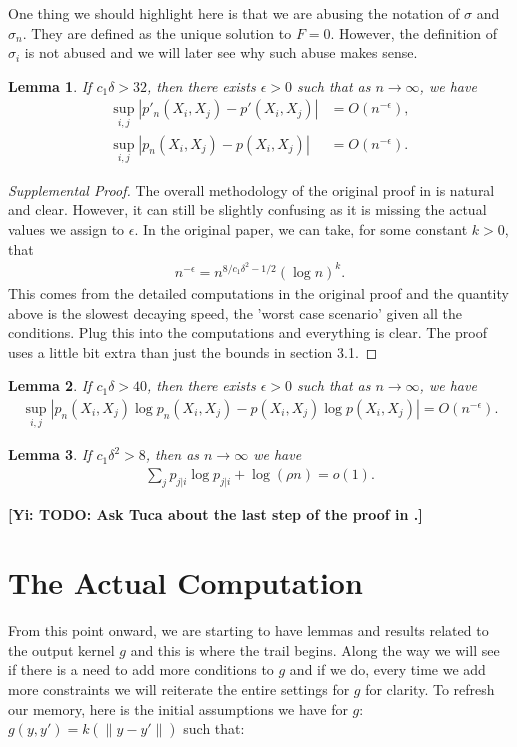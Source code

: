 \documentclass[10pt]{article}
\newcommand{\norm}[1]{\left\lVert#1\right\rVert}
\newcommand{\gy}[1]{\textbf{\color{gred}[Yi: #1]}}
\newtheorem{lemma}{\bf Lemma}
\newenvironment{Proof of lemma}{\noindent{\bf Proof of Lemma}}{\hfill$\Box$\newline}
\newenvironment{Proof of claim}{\noindent{\bf Proof of claim}}{\hfill$\Box$\newline}
\newenvironment{Proof of theorem}{\noindent{\bf Proof of Theorem}}{\hfill\scriptsize{$\Box$}\newline}
\newenvironment{Proof of theorems}{\noindent{\bf Proof of Theorems}}{\hfill$\Box$\newline}
\newenvironment{Proof of proposition}{\noindent{\bf Proof of Proposition}}{\hfill$\Box$\newline}
\newenvironment{Proof of propositions}{\noindent{\bf Proof of Propositions}}{\hfill$\Box$\newline}
\newenvironment{Proof of exercise}{\noindent{\it Proof of Exercise:}}{\hfill$\Box$}
\numberwithin{equation}{section}
\begin{document}
One thing we should highlight here is that we are abusing the notation of $\sigma$ and $\sigma_n$. They are defined as the unique solution to $F=0$. However, the definition of $\sigma_i$ is not abused and we will later see why such abuse makes sense.
\begin{lemma} \label{integrand_lemma_2}
    If $c_1 \delta >32$, then there exists $\epsilon>0$ such that as $n \to \infty$, we have
    \begin{align}
        \sup_{i,j}|p'_n(X_i,X_j)-p'(X_i,X_j)| & = O(n^{-\epsilon}), \nonumber \\
        \sup_{i,j}|p_n(X_i,X_j)-p(X_i,X_j)|   & = O(n^{-\epsilon}).
    \end{align}
\end{lemma}
\begin{proof}[Supplemental Proof]
    The overall methodology of the original proof in \cite{auffinger-tsne} is natural and clear. However, it can still be slightly confusing as it is missing the actual values we assign to $\epsilon$. In the original paper, we can take, for some constant $k>0$, that
    \begin{align}
        n^{-\epsilon} = n^{8/c_1\delta^2 -1/2} (\log n)^k.
    \end{align}
    This comes from the detailed computations in the original proof and the quantity above is the slowest decaying speed, the 'worst case scenario' given all the conditions. Plug this into the computations and everything is clear. The proof uses a little bit extra than just the bounds in section 3.1.
\end{proof}
\begin{lemma} \label{integrand_lemma}
    If $c_1\delta>40$, then there exists $\epsilon>0$ such that as $n \to \infty$, we have
    \begin{align}
        \sup_{i,j}|p_n(X_i,X_j)\log p_n(X_i,X_j) - p(X_i,X_j)\log p(X_i,X_j)| = O(n^{-\epsilon}).
    \end{align}
\end{lemma}
\begin{lemma}
    If $c_1\delta^2>8$, then as $n \to \infty$ we have
    \begin{align}
        \sum_j p_{j|i} \log p_{j|i} + \log (\rho n) = o(1).
    \end{align}
\end{lemma}
\gy{TODO: Ask Tuca about the last step of the proof in \cite{auffinger-tsne}.}
\section{The Actual Computation} \label{section_actual_computation}
From this point onward, we are starting to have lemmas and results related to
the output kernel $g$ and this is where the trail begins. Along the way we will
see if there is a need to add more conditions to $g$ and if we do, every time
we add more constraints we will reiterate the entire settings for $g$ for
clarity. To refresh our memory, here is the initial assumptions we have for
$g$: $g(y,y') = k (\norm{y-y'})$ such that:
\end{document}
